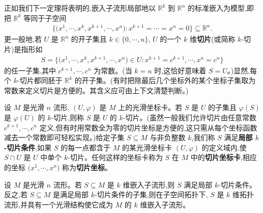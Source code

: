 \documentclass[../../main.tex]{subfiles}
\begin{document}
正如我们下一定理将表明的,嵌入子流形局部地以 $\mathbb{R}^k$ 到 $\mathbb{R}^n$ 的标准嵌入为模型,即把 $\mathbb{R}^k$ 等同于子空间
\begin{align*}
\bigl\{\bigl(x^1,\cdots ,x^k,x^{k+1},\cdots ,x^n\bigr):x^{k+1}=\cdots=x^n=0\bigr\}\subseteq\mathbb{R}^n.
\end{align*}
更一般地,若 $U$ 是 $\mathbb{R}^n$ 的开子集且 $k\in\{0,\cdots ,n\}$, $U$ 的一个 $k$ 维\textbf{切片}(或简称 $k$-切片)是指形如
\begin{align*}
S=\bigl\{\bigl(x^1,\cdots ,x^k,x^{k+1},\cdots ,x^n\bigr)\in U:x^{k+1}=c^{k+1},\cdots ,x^n=c^n\bigr\}
\end{align*}
的任一子集,其中 $c^{k+1},\cdots ,c^n$ 为常数。(当 $k=n$ 时,这恰好意味着 $S=U$。)显然,每个 $k$-切片都同胚于 $\mathbb{R}^k$ 的开子集。(有时把除最后几个坐标外的某个坐标子集取为常数来定义切片是方便的。其含义应可由上下文清楚判断。)

设 $M$ 是光滑 $n$ 流形, $(U,\varphi)$ 是 $M$ 上的光滑坐标卡。若 $S$ 是 $U$ 的子集且 $\varphi(S)$ 是 $\varphi(U)$ 的 $k$-切片,则称 $S$ 是 $U$ 的 $k$-切片。(虽然一般我们允许切片由任意常数 $c^{k+1},\cdots ,c^n$ 定义,但有时用常数全为零的切片坐标是方便的,这只需从每个坐标函数减去一个常数即可轻松实现。)给定子集 $S\subseteq M$ 与非负整数 $k$,我们称 $S$ 满足\textbf{局部 $k$-切片条件},如果 $S$ 的每一点都含于 $M$ 的某光滑坐标卡 $(U,\varphi)$ 的定义域内,使 $S\cap U$ 是 $U$ 中单个 $k$-切片。任何这样的坐标卡称为 $S$ 在 $M$ 中的\textbf{切片坐标卡},相应的坐标 $\bigl(x^1,\cdots ,x^n\bigr)$ 称为\textbf{切片坐标}。

\begin{theorem}\label{theorem:ch05-slice-criterion}
设 $M$ 是光滑 $n$ 流形。若 $S\subseteq M$ 是 $k$ 维嵌入子流形,则 $S$ 满足局部 $k$-切片条件。反之,若 $S\subseteq M$ 是满足局部 $k$-切片条件的子集,则在子空间拓扑下, $S$ 是 $k$ 维拓扑流形,并具有一个光滑结构使它成为 $M$ 的 $k$ 维嵌入子流形。
\end{theorem}
\end{document}
